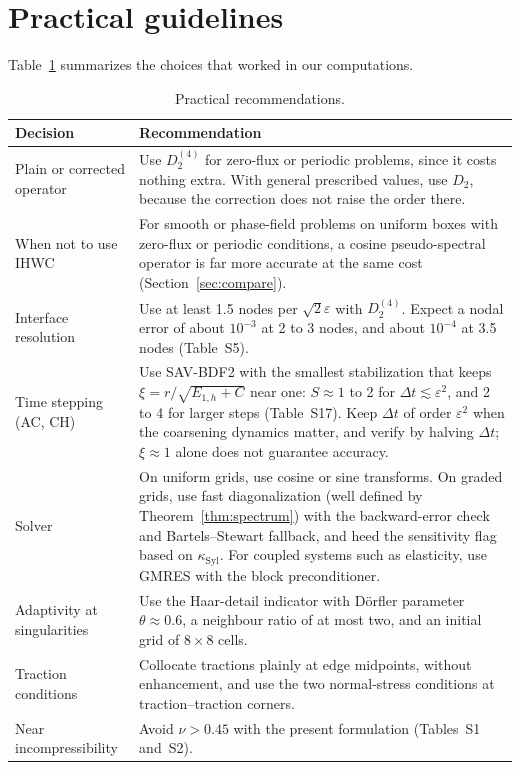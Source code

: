 \documentclass[smallextended,envcountsame]{svjour3}
\begin{document}
\begin{table}[t]\centering\footnotesize
\caption{Time per Cahn--Hilliard time step with $D_2^{(4)}$.}\label{tab:perf}

\end{table}

\section{Practical guidelines}\label{sec:guide}
Table~\ref{tab:guide} summarizes the choices that worked in our computations.

\begin{table}[t]\centering\footnotesize
\caption{Practical recommendations.}\label{tab:guide}
\begin{tabular}{p{}p{}}
\toprule
Decision & Recommendation\\
\midrule
Plain or corrected operator & Use $D_2^{(4)}$ for zero-flux or periodic problems, since it costs nothing extra. With general prescribed values, use $D_2$, because the correction does not raise the order there.\\
When not to use IHWC & For smooth or phase-field problems on uniform boxes with zero-flux or periodic conditions, a cosine pseudo-spectral operator is far more accurate at the same cost (Section~\ref{sec:compare}).\\
Interface resolution & Use at least 1.5 nodes per $\sqrt2\varepsilon$ with $D_2^{(4)}$. Expect a nodal error of about $10^{-3}$ at 2 to 3 nodes, and about $10^{-4}$ at 3.5 nodes (Table~S5).\\
Time stepping (AC, CH) & Use SAV-BDF2 with the smallest stabilization that keeps $\xi=r/\sqrt{E_{1,h}+C}$ near one: $S\approx1$ to 2 for $\Delta t\lesssim\varepsilon^2$, and 2 to 4 for larger steps (Table~S17). Keep $\Delta t$ of order $\varepsilon^2$ when the coarsening dynamics matter, and verify by halving $\Delta t$; $\xi\approx1$ alone does not guarantee accuracy.\\
Solver & On uniform grids, use cosine or sine transforms. On graded grids, use fast diagonalization (well defined by Theorem~\ref{thm:spectrum}) with the backward-error check and Bartels--Stewart fallback, and heed the sensitivity flag based on $\kappa_{\mathrm{Syl}}$. For coupled systems such as elasticity, use GMRES with the block preconditioner.\\
Adaptivity at singularities & Use the Haar-detail indicator with D\"orfler parameter $\theta\approx0.6$, a neighbour ratio of at most two, and an initial grid of $8\times8$ cells.\\
Traction conditions & Collocate tractions plainly at edge midpoints, without enhancement, and use the two normal-stress conditions at traction--traction corners.\\
Near incompressibility & Avoid $\nu>0.45$ with the present formulation (Tables~S1 and~S2).\\
\bottomrule
\end{tabular}
\end{table}
\end{document}
